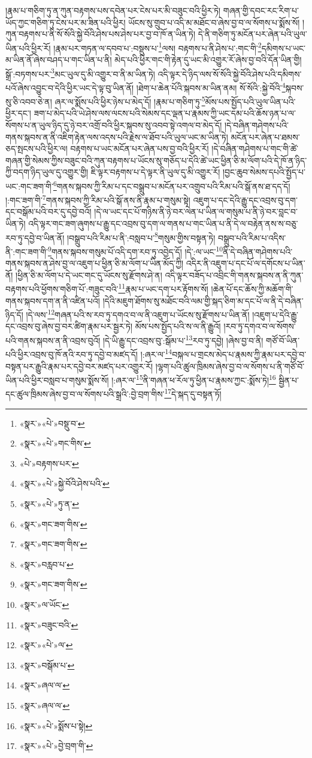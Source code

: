 །རྣམ་པ་གཅིག་ཏུ་ན་ཀུན་བརྟགས་པས་དབེན་པར་ངེས་པར་མི་བཟུང་བའི་ཕྱིར་ཏེ། གཞན་གྱི་དབང་རང་རིག་པ་ཡོད་ཀྱང་གཅིག་ཏུ་ངེས་པར་མ་ཟིན་པའི་ཕྱིར། ཡོངས་སུ་གྲུབ་པ་འདི་མ་མཐོང་བ་ཞེས་བྱ་བ་ལ་སོགས་པ་སྨོས་སོ། །ཀུན་བརྟགས་པ་ནི་སོ་སོའི་སྐྱེ་བོའི་ཤེས་པས་ཤེས་པར་བྱ་བ་ཁོ་ན་ཡིན་ཏེ། དེ་ནི་གཅིག་ཏུ་མངོན་པར་ཞེན་པའི་ཡུལ་ཡིན་པའི་ཕྱིར་རོ། །རྣམ་པར་གཏན་ལ་དབབ་པ་:བསྡུས་པ་\footnote{«སྣར་»«པེ་»བསྡུ་བ་}ལས། བརྟགས་པ་ནི་ཤེས་པ་:གང་གི་\footnote{«སྣར་»«པེ་»གང་གིས་}དམིགས་པ་ཡང་མ་ཡིན་ནོ་ཞེས་བཤད་པ་གང་ཡིན་པ་ནི། མེད་པའི་ཕྱིར་གང་གི་རྟེན་དུ་ཡང་མི་འགྱུར་རོ་ཞེས་བྱ་བའི་དོན་ཡིན་གྱི། སྒྲོ་:བཏགས་པར་\footnote{«པེ་»བརྟགས་པར་}མང་ཡུལ་དུ་མི་འགྱུར་བ་ནི་མ་ཡིན་ཏེ། འདི་ལྟར་དེ་ཉིད་ལས་སོ་སོའི་སྐྱེ་བོའི་ཤེས་པའི་དམིགས་པའོ་ཞེས་འབྱུང་བ་དེའི་ཕྱིར་ཡང་དེ་ལྟ་བུ་ཡིན་ནོ། །ཐེག་པ་ཆེན་པོའི་སྐབས་མ་ཡིན་ནམ། སོ་སོའི་:སྐྱེ་བོའི་\footnote{«སྣར་»«པེ་»སྐྱེ་བོའི་ཤེས་པའི་}སྐབས་སུ་ཅི་འབབ་ཅེ་ན། ཞར་ལ་སྨོས་པའི་ཕྱིར་ཉེས་པ་མེད་དོ། །རྣམ་པ་གཅིག་ཏུ་\footnote{«སྣར་»«པེ་»ཏུ་ན་}མོས་པས་སྤྱོད་པའི་ཡུལ་ཡིན་པའི་ཕྱིར་དང་། ཟག་པ་མེད་པའི་ཡེ་ཤེས་ལས་ལངས་པའི་སེམས་དང་ལྡན་པ་རྣམས་ཀྱི་ཡང་དམ་པའི་ཆོས་ཉན་པ་ལ་སོགས་པ་ན་ཡུལ་ཉིད་དུ་ཉེ་བར་འགྲོ་བའི་ཕྱིར་སྐབས་སུ་འབབ་སྟེ་འགལ་བ་མེད་དོ། །དེ་བཞིན་གཤེགས་པའི་གནས་སྐབས་ན་ནི་འཇིག་རྟེན་ལས་འདས་པའི་རྗེས་ལ་ཐོབ་པའི་ཡུལ་ཡང་མ་ཡིན་ཏེ། མངོན་པར་ཞེན་པ་ཐམས་ཅད་སྤངས་པའི་ཕྱིར་ལ། བརྟགས་པ་ཡང་མངོན་པར་ཞེན་པས་བྱ་བའི་ཕྱིར་རོ། །དེ་བཞིན་གཤེགས་པ་གང་གི་ཚེ་གཞན་གྱི་སེམས་ཀྱིས་བཟུང་བའི་ཀུན་བརྟགས་པ་ཡོངས་སུ་གཅོད་པ་དེའི་ཚེ་ཡང་ཕྱིན་ཅི་མ་ལོག་པའི་དེ་ཁོ་ན་ཉིད་ཀྱི་བདག་ཉིད་ཡུལ་དུ་འགྱུར་གྱི། ཇི་ལྟར་བརྟགས་པ་དེ་ལྟར་ནི་ཡུལ་དུ་མི་འགྱུར་རོ། །བྱང་ཆུབ་སེམས་དཔའི་སྤྱོད་པ་ཡང་:གང་ཟག་གི་\footnote{«སྣར་»གང་ཟག་གིས་}གནས་སྐབས་ཀྱི་རིམ་པ་དང་བསྒྲུབ་པ་མངོན་པར་འགྲུབ་པའི་རིམ་པའི་སྒོ་ནས་ཐ་དད་དོ། །:གང་ཟག་གི་\footnote{«སྣར་»གང་ཟག་གིས་}གནས་སྐབས་ཀྱི་རིམ་པའི་སྒོ་ནས་ནི་རྣམ་པ་གསུམ་སྟེ། འཇུག་པ་དང་དེའི་རྒྱུ་དང་འབྲས་བུ་དག་དང་བསྒོམ་པའི་བར་དུ་དབྱེ་བའོ། །དེ་ལ་ཡང་དང་པོ་གཉིས་ནི་ཉེ་བར་ལེན་པ་ཡིན་ལ་གསུམ་པ་ནི་ཉེ་བར་བླང་བ་ཡིན་ཏེ། འདི་ལྟར་གང་ཟག་ཞུགས་པ་རྒྱུ་དང་འབྲས་བུ་དག་ལ་གནས་པ་གང་ཡིན་པ་ནི་དེ་ལ་བརྟེན་ནས་ས་བཅུ་རབ་ཏུ་དབྱེ་བ་ཡིན་ནོ། །བསྒྲུབ་པའི་རིམ་པ་ནི་:བསླབ་པ་\footnote{«སྣར་»བརླབ་པ་}གསུམ་གྱིས་བསྟན་ཏེ། བསྒྲུབ་པའི་རིམ་པ་འདིས་ནི་:གང་ཟག་གི་\footnote{«སྣར་»གང་ཟག་གིས་}གནས་སྐབས་གསུམ་པོ་འདི་དག་རབ་ཏུ་འབྱེད་དོ། །དེ་:ལ་ཡང་\footnote{«སྣར་»ལ་ཡོང་}ནི་དེ་བཞིན་གཤེགས་པའི་གནས་སྐབས་ན་ཤེས་བྱ་ལ་འཇུག་པ་ཕྱིན་ཅི་མ་ལོག་པ་ཡིན་མོད་ཀྱི། འདིར་ནི་འཇུག་པ་དང་པོ་ལ་དགོངས་པ་ཡིན་ནོ། །ཕྱིན་ཅི་མ་ལོག་པ་དེ་ཡང་གང་དུ་ཡོངས་སུ་རྫོགས་ཤེ་ན། འདི་ལྟར་བཟོད་པ་འབྲིང་གི་གནས་སྐབས་ན་ནི་ཀུན་བརྟགས་པའི་ཕྱོགས་གཅིག་པོ་:གཟུང་བའི་\footnote{«སྣར་»བཟུང་བའི་}རྣམ་པ་ཡང་དག་པར་རྟོགས་སོ། །ཆེན་པོ་དང་ཆོས་ཀྱི་མཆོག་གི་གནས་སྐབས་དག་ན་ནི་འཛིན་པའོ། །དེའི་མཇུག་ཐོགས་སུ་མཐོང་བའི་ལམ་གྱི་སྐད་ཅིག་མ་དང་པོ་ལ་ནི་དེ་བཞིན་ཉིད་དོ། །དེ་ལས་\footnote{«སྣར་»«པེ་»ལ་}གཞན་པའི་ས་རབ་ཏུ་དགའ་བ་ལ་ནི་འཇུག་པ་ཡོངས་སུ་རྫོགས་པ་ཡིན་ནོ། །འཇུག་པ་དེའི་རྒྱུ་དང་འབྲས་བུ་ཞེས་བྱ་བར་ཚིག་རྣམ་པར་སྦྱར་ཏེ། མོས་པས་སྤྱོད་པའི་ས་ལ་ནི་རྒྱུའོ། །རབ་ཏུ་དགའ་བ་ལ་སོགས་པའི་གནས་སྐབས་ན་ནི་འབྲས་བུའོ། །དེ་ཡི་རྒྱུ་དང་འབྲས་བུ་:སྒོམ་པ་\footnote{«སྣར་»བསྒོམ་པ་}རབ་ཏུ་དབྱེ། །ཞེས་བྱ་བ་ནི། གཙོ་བོ་ཡིན་པའི་ཕྱིར་འབྲས་བུ་ཁོ་ནའི་རབ་ཏུ་དབྱེ་བ་མཛད་དོ། །:ཞར་ལ་\footnote{«སྣར་»ཞལ་ལ་}བསྐལ་པ་གྲངས་མེད་པ་རྣམས་ཀྱི་རྣམ་པར་དབྱེ་བ་བསྟན་པར་རྒྱུའི་རྣམ་པར་དབྱེ་བར་མཛད་པར་འགྱུར་རོ། །ལྷག་པའི་ཚུལ་ཁྲིམས་ཞེས་བྱ་བ་ལ་སོགས་པ་ནི་གཙོ་བོ་ཡིན་པའི་ཕྱིར་བསླབ་པ་གསུམ་སྨོས་སོ། །:ཞར་ལ་\footnote{«སྣར་»ཞལ་ལ་}ནི་གཞན་ཕ་རོལ་ཏུ་ཕྱིན་པ་རྣམས་ཀྱང་:སྨོས་ཏེ།\footnote{«སྣར་»«པེ་»སྨོས་པ་སྟེ།} སྦྱིན་པ་དང་ཚུལ་ཁྲིམས་ཞེས་བྱ་བ་ལ་སོགས་པའི་སྒྲའི་:བྱེ་བྲག་གིས་\footnote{«སྣར་»«པེ་»བྱེ་བྲག་གི་}དེ་སྐད་དུ་བསྟན་ཏོ། 